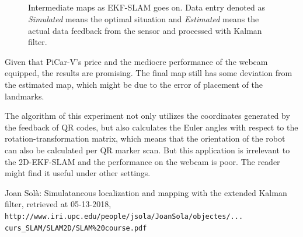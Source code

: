 \documentclass[12pt]{article}
\begin{document}
\begin{figure}[h]
\\
 \\
 \\
 \\
\caption{Intermediate maps as EKF-SLAM goes on. Data entry denoted as \textit{Simulated} means the optimal situation and \textit{Estimated} means the actual data feedback from the sensor and processed with Kalman filter.}
\label{some}
\end{figure}



Given that PiCar-V's price and the mediocre performance of the webcam equipped, the results are promising. The final map still has some deviation from the estimated map, which might be due to the error of placement of the landmarks. 

The algorithm of this experiment not only utilizes the coordinates generated by the feedback of QR codes, but also calculates the Euler angles with respect to the rotation-transformation matrix, which means that the orientation of the robot can also be calculated per QR marker scan. But this application is irrelevant to the 2D-EKF-SLAM and the performance on the webcam is poor. The reader might find it useful under other settings.
 

\clearpage
\begin{thebibliography}{9}

Joan Sol\`a: Simulataneous localization and mapping
with the extended Kalman filter, retrieved at 05-13-2018,
\\\texttt{http://www.iri.upc.edu/people/jsola/JoanSola/objectes/...\\curs\_SLAM/SLAM2D/SLAM\%20course.pdf}
\end{thebibliography}


 
\end{document}

